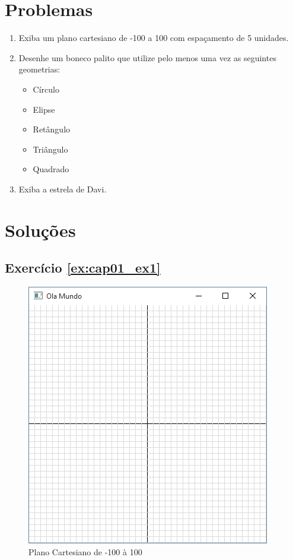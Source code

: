 \section*{Problemas}
\begin{enumerate}
\item
  Exiba um plano cartesiano de -100 a 100 com espaçamento de 5 unidades.
  \label{ex:cap01_ex1}

\item
  Desenhe um boneco palito que utilize pelo menos uma vez as seguintes geometrias:
  \begin{itemize}
  \item
    Círculo
  \item
    Elipse
  \item
    Retângulo
  \item
    Triângulo
  \item
    Quadrado
  \end{itemize}
  \label{ex:cap01_ex2}

\item
  Exiba a estrela de Davi.
  \label{ex:cap01_ex3}

\end{enumerate}


\section*{Soluções}

\subsection*{Exercício \ref{ex:cap01_ex1}}
\begin{figure}[ht]
  \centerline{\includegraphics[width=.5\textwidth]{img/cap1_ex1.png}}
  \caption{Plano Cartesiano de -100 à 100}
  \label{fig:cap01_ex1}
\end{figure}

